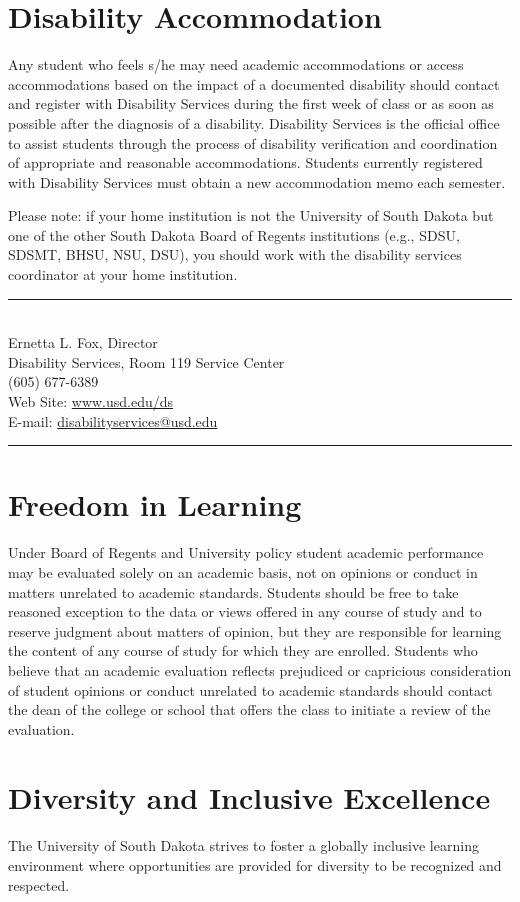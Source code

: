 \documentclass[11pt, letterpaper]{article}
\begin{document}
\section{Disability Accommodation}
\label{s:disa}

Any student who feels s/he may need academic accommodations or access
accommodations based on the impact of a documented disability should contact
and register with Disability Services during the first week of class or as soon
as possible after the diagnosis of a disability.  Disability Services is the
official office to assist students through the process of disability
verification and coordination of appropriate and reasonable accommodations.
Students currently registered with Disability Services must obtain a new
accommodation memo each semester. 

Please note: if your home institution is not the University of South Dakota but
one of the other South Dakota Board of Regents institutions (e.g., SDSU, SDSMT,
BHSU, NSU, DSU), you should work with the disability services coordinator at
your home institution.

\vspace{0.5cm}
\begin{minipage}[b]{0.75\linewidth}
\rule{\textwidth}{0.1mm}\\
Ernetta L. Fox, Director\\
Disability Services, Room 119 Service Center\\
(605) 677-6389\\
Web Site: \href{http://www.usd.edu/ds}{www.usd.edu/ds}\\
E-mail: \href{mailto:disabilityservices@usd.edu}{disabilityservices@usd.edu}\\
\rule{\textwidth}{0.1mm}
\end{minipage}

\section{Freedom in Learning}
\label{s:free}

Under Board of Regents and University policy student academic performance may
be evaluated solely on an academic basis, not on opinions or conduct in matters
unrelated to academic standards. Students should be free to take reasoned
exception to the data or views offered in any course of study and to reserve
judgment about matters of opinion, but they are responsible for learning the
content of any course of study for which they are enrolled. Students who
believe that an academic evaluation reflects prejudiced or capricious
consideration of student opinions or conduct unrelated to academic standards
should contact the dean of the college or school that offers the class to
initiate a review of the evaluation.

\section{Diversity and Inclusive Excellence}
\label{s:dive}

The University of South Dakota strives to foster a globally inclusive learning
environment where opportunities are provided for diversity to be recognized and
respected.
\end{document}
